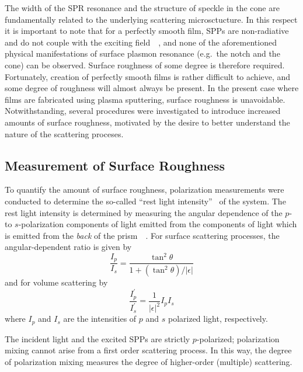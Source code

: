 The width of the SPR resonance and the structure of speckle in the cone are
fundamentally related to the underlying scattering microsctucture.  In this
respect it is important to note that for a perfectly smooth film, SPPs are
non-radiative and do not couple with the exciting
field~\cite{johansson1990theory}~\cite{otto1968excitation}, and none of the
aforementioned physical manifestations of surface plasmon resonance (e.g.\ the
notch and the cone) can be observed.  Surface roughness of some degree is
therefore required.  Fortunately, creation of perfectly smooth films is rather
difficult to achieve, and some degree of roughness will almost always be
present.  In the present case where films are fabricated using plasma
sputtering, surface roughness is unavoidable.  Notwithstanding, several
procedures were investigated to introduce increased amounts of surface
roughness, motivated by the desire to better understand the nature of the
scattering proceses.

\subsection{Measurement of Surface Roughness}
To quantify the amount of surface roughness, polarization measurements were
conducted to determine the so-called ``rest light
intensity''~\cite{horstmann1977multiple} of the system.  The rest light
intensity is determined by measuring the angular dependence of the $p$- to
$s$-polarization components of light emitted from the components of light
which is emitted from the \textit{back} of the
prism~\cite{kretschmann1972decay}~\cite{hornauer1976light}.  For surface scattering processes, the
angular-dependent ratio is given by~\cite{kretschmann1972thesis}
\begin{equation}
\frac{I_p}{I_s} = \frac{\tan^2\theta}{1+(\tan^2\theta)/|\epsilon|}
\label{eqn:ipssurface}
\end{equation}
and for volume scattering by
\begin{equation}
\frac{I^\prime_p}{I^\prime_s} = \frac{1}{|\epsilon|^2} I_p I_s
\label{eqn:ipsvolume}
\end{equation}
where $I_p$ and $I_s$ are the intensities of $p$ and $s$ polarized light,
respectively.

The incident light and the excited SPPs are strictly $p$-polarized;
polarization mixing cannot arise from a first order scattering process.
In this way, the degree of polarization mixing measures the degree of
higher-order (multiple) scattering.

